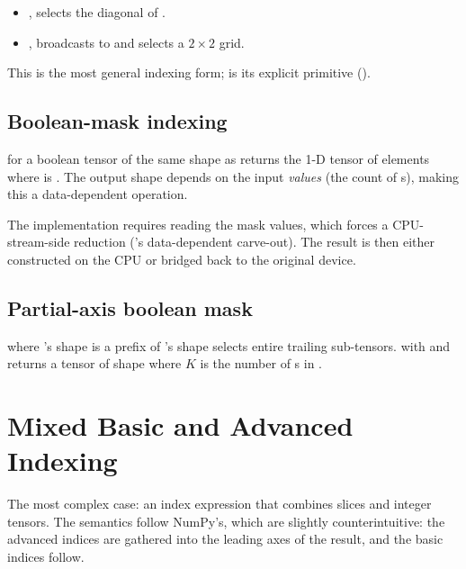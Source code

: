 \begin{itemize}
  \item {}, 
    selects the diagonal of .
  \item {}, 
    broadcasts  to \code{[[0, 1], [0, 1]]} and
    selects a \(2 \times 2\) grid.
\end{itemize}

This is the most general indexing form;  is its
explicit primitive ().

\subsection{Boolean-mask indexing}
\label{ssec:indexing:bool_mask}

 for a boolean tensor  of the same shape
as  returns the 1-D tensor of elements where 
is . The output shape depends on the input \emph{values}
(the count of s), making this a data-dependent operation.

The implementation requires reading the mask values, which forces
a CPU-stream-side reduction ('s
data-dependent carve-out). The result is then either constructed
on the CPU or bridged back to the original device.

\subsection{Partial-axis boolean mask}
\label{ssec:indexing:partial_bool}

 where 's shape is a prefix of 's
shape selects entire trailing sub-tensors.  with
 and 
returns a tensor of shape  where \(K\) is the
number of s in .

\section{Mixed Basic and Advanced Indexing}
\label{sec:indexing:mixed}

The most complex case: an index expression that combines slices
and integer tensors. The semantics follow NumPy's, which are
slightly counterintuitive: the advanced indices are gathered into
the leading axes of the result, and the basic indices follow.

